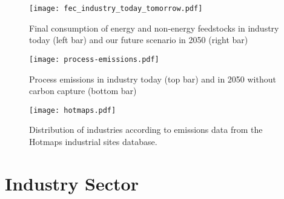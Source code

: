 \begin{SCfigure}
    \texttt{[image: fec\_industry\_today\_tomorrow.pdf]}
    \caption{Final consumption of energy and non-energy feedstocks in industry today (left bar) and
    our future scenario in 2050 (right bar)}
    \label{fig:fec-industry}
\end{SCfigure}

\begin{SCfigure}
    \texttt{[image: process-emissions.pdf]}
    \caption{Process emissions in industry today (top bar) and in 2050 without carbon capture (bottom bar)}
    \label{fig:process-emissions}
\end{SCfigure}


\begin{SCfigure}
    \texttt{[image: hotmaps.pdf]}
    \caption{Distribution of industries according to emissions data from the Hotmaps industrial sites database.}
    \label{fig:hotmaps}
\end{SCfigure}


\section{Industry Sector}
\label{sec:si:industry}

